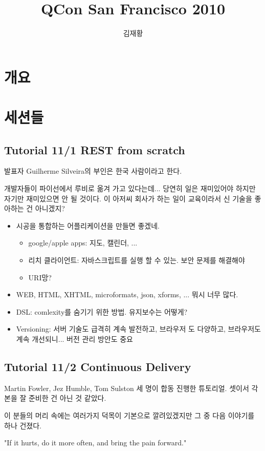 \documentclass[a4paper]{article}
\title{QCon San Francisco 2010}
\author{김재황}
\begin{document}
\section{개요}

\section{세션들}

\subsection{Tutorial 11/1 REST from scratch}
 
발표자 Guilherme Silveira의 부인은 한국 사람이라고 한다.
 
개발자들이 파이선에서 루비로 옮겨 가고 있다는데... 당연히 일은 재미있어야 하지만 자기만 재미있으면 안 될 것이다. 이 아저씨 회사가 하는 일이 교육이라서 신 기술을 좋아하는 건 아니겠지?
\begin{itemize}
\item 시공을 통합하는 어플리케이션을 만들면 좋겠네.
  \begin{itemize}
  \item google/apple apps: 지도, 캘린더, ...
  \item 리치 클라이언트: 자바스크립트를 실행 할 수 있는. 보안 문제를 해결해야
  \item URI망?
  \end{itemize}
\item  WEB, HTML, XHTML, microformats, json, xforms, ... 뭐시 너무 많다.
\item DSL: comlexity를 숨기기 위한 방법. 유지보수는 어떻게?
\item  Versioning: 서버 기술도 급격히 계속 발전하고, 브라우저 도 다양하고, 브라우저도 계속 개선되니... 버전 관리 방안도 중요
\end{itemize}

\subsection{Tutorial 11/2 Continuous Delivery}

Martin Fowler, Jez Humble, Tom Sulston 세 명이 합동 진행한 튜토리얼.
셋이서 각본을 잘 준비한 건 아닌 것 같았다. 
 
이 분들의 머리 속에는 여러가지 덕목이 기본으로 깔려있겠지만 그 중 다음 이야기를 하나 건졌다.
 
"If it hurts, do it more often, and bring the pain forward."
 
\end{document}
